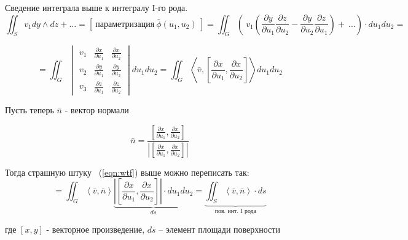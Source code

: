 	\begin{proposition*}
	Сведение интеграла выше к интегралу I-го рода.
	\[
	\iint_S v_1 dy \wedge dz + \ldots = \left[~ \text{параметризация}~ \bar{\phi}(u_1, u_2) ~\right] 
	= \iint_G (~v_1 \left( \frac{\partial y}{\partial u_1}  \frac{\partial z}{\partial u_2} -  \frac{\partial y}{\partial u_2} \frac{\partial z}{\partial u_1} \right) + ~\ldots )\cdot du_1 du_2 = 
	\]
	
	\begin{equation}
	= \iint_G 	\begin{vmatrix} 
	v_1 & \frac{\partial x}{\partial u_1} & \frac{\partial x}{\partial u_2} \\
	v_2 & \frac{\partial y}{\partial u_1} & \frac{\partial y}{\partial u_2} \\
	v_3 & \frac{\partial z}{\partial u_1} & \frac{\partial z}{\partial u_2}
	\end{vmatrix} du_1 du_2 
	= \iint_G \left\langle \bar{v}, \left[  \frac{\partial x}{\partial u_1},  \frac{\partial x}{\partial u_2} \right] \right\rangle du_1 du_2 
	\label{eqn:wtf}
	\end{equation}
	
	Пусть теперь $\bar{n}$ - вектор нормали
	
	\[
		\bar{n} = \dfrac{  \left[  \frac{\partial x}{\partial u_1},  \frac{\partial x}{\partial u_2} \right] }{ \left|  \left[  \frac{\partial x}{\partial u_1},  \frac{\partial x}{\partial u_2} \right] \right| } 
	\]
	
	Тогда страшную штуку ~(\ref{eqn:wtf}) выше можно переписать так:
	\[
	= \iint_G \left\langle \bar{v}, \bar{n}  \right\rangle \underbrace{ \left|  \left[  \frac{\partial x}{\partial u_1},  \frac{\partial x}{\partial u_2} \right] \right| \cdot du_1 du_2 }_{ds}
	= \underbrace{ \iint_S  \left\langle \bar{v}, \bar{n}  \right\rangle \cdot ds }_{\text{пов. инт. I рода}}
	\]
	
	где $\left[ x, y \right]$ - векторное произведение, $ds$ -- элемент площади поверхности
	
	
	\end{proposition*}


